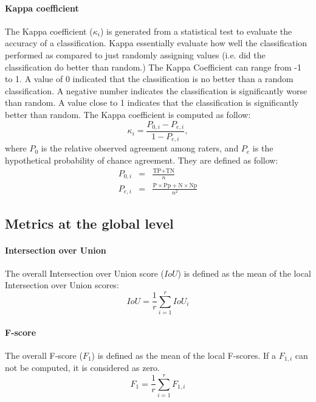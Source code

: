 \paragraph{Kappa coefficient \\}
The Kappa coefficient  \citep{cohen1960coefficient} ($\kappa_{i}$) is generated from a statistical test to evaluate the accuracy of a classification. Kappa essentially evaluate how well the classification performed as compared to just randomly assigning values (i.e. did the classification do better than random.) The Kappa Coefficient can range from -1 to 1. A value of 0 indicated that the classification is no better than a random classification. A negative number indicates the classification is significantly worse than random. A value close to 1 indicates that the classification is significantly better than random.
The Kappa coefficient is computed as follow:
\begin{equation}
\kappa_{i}=\frac{P_{0,i}-P_{e,i}}{1-P_{e,i}},
\end{equation}
where $P_{0}$ is the relative observed agreement among raters, and $P_{e}$ is the hypothetical probability of chance agreement. They are defined as follow:
\begin{eqnarray}
P_{0,i} & = & \frac{\text{TP}+\text{TN}}{n} \\
P_{e,i} & = & \frac{\text{P} \times \text{Pp} + \text{N} \times \text{Np}}{n^{2}}
\end{eqnarray}

\subsection{Metrics at the global level}

\paragraph{Intersection over Union \\}
The overall Intersection over Union score ($IoU$) is defined as the mean of the local Intersection over Union scores:
\begin{equation}
IoU=\frac{1}{r}\sum_{i=1}^{r}IoU_{i}
\end{equation}

\paragraph{F-score \\}
The overall F-score ($F_{1}$) is defined as the mean of the local F-scores. If a $F_{1,i}$ can not be computed, it is considered as zero.
\begin{equation}
F_{1}=\frac{1}{r}\sum_{i=1}^{r}F_{1,i}
\end{equation}


